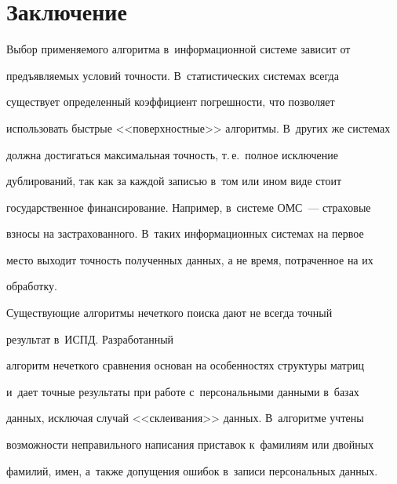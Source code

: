   \vspace*{-6pt}


  


\section{Заключение}





\vspace*{-2pt}





  Выбор применяемого алгоритма в~информационной системе зависит от 


предъявляемых условий точности. В~статистических системах всегда 


существует определенный коэффициент погрешности, что позволяет 


использовать быстрые <<поверхностные>> алгоритмы. В~других же системах 


должна достигаться максимальная точность, т.\,е.\ полное исключение 


дублирований, так как за каждой записью в~том или ином виде стоит 


государственное финансирование. Например, в~системе ОМС~--- страховые 


взносы на застрахованного. В~таких информационных системах на первое 


место выходит точность полученных данных, а не время, потраченное на их 


обработку.


  


  Существующие алгоритмы нечеткого поиска дают не всегда точный 


результат в~ИСПД. Разработанный 


алгоритм нечеткого сравнения основан на особенностях структуры матриц 


и~дает точные результаты при работе с~персональными данными в~базах 


данных, исключая случай <<склеивания>> данных. В~алгоритме учтены 


возможности неправильного написания приставок к~фамилиям или двойных 


фамилий, имен, а~также допущения ошибок в~записи персональных данных.





